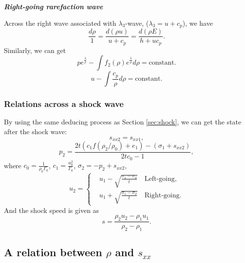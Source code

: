 \documentclass[review]{elsarticle}
\numberwithin{equation}{section}
\numberwithin{table}{section}
\begin{document}
\emph{\textbf{Right-going rarefaction wave} }

Across the right wave associated with $\lambda_3$-wave, ($\lambda_3=u+c_p$), we have
\begin{equation}
  \frac{d\rho}{1} = \frac{d(\rho u)}{u+c_p} = \frac{d(\rho E)}{h+uc_p}.
\end{equation}
Similarly, we can get %
\begin{equation}\label{eq:p_rhopR}
  p e^{\frac{\lambda}{\rho}} - \int f_2(\rho) e^{\frac{\lambda}{\rho}}d\rho = \text{constant}.
\end{equation}
\begin{equation}\label{eq:u_rhopR}
  u-\int\frac{c_p}{\rho} d\rho = \text{constant}.
\end{equation}

\subsubsection{Relations across  a shock wave}\label{sec:shockp}
By using the same deducing process as Section \ref{sec:shock}, we can get the state after the shock wave:
\begin{equation}
  s_{xx2} = s_{xx1},
\end{equation}
\begin{equation}\label{eq:shockp}
  p_2= \frac{2t(c_1f(\rho_2/\rho_0)+e_1)-(\sigma_1+s_{xx2})}{2tc_0-1},
\end{equation}
where $c_0 = \frac{1}{\rho_0\Gamma_0}$, $c_1 = \frac{a_0^2}{\Gamma_0}$, $\sigma_2 = -p_2 +s_{xx2}$,
\begin{equation}\label{eq:shockup}
  u_2 = \left\{ \begin{aligned}
	 & u_1 - \sqrt{\frac{\sigma_1- \sigma_2}{t}} \quad \text{Left-going}, \\
	 & u_1 + \sqrt{\frac{\sigma_1- \sigma_2}{t}} \quad \text{Right-going}.
	\end{aligned}
	\right.
  \end{equation}
And the shock speed is given as
\begin{equation}
  s = \frac{\rho_2u_2-\rho_1u_1}{\rho_2-\rho_1}.
\end{equation}



\subsection{A relation between $\rho$ and $s_{xx}$ }\label{sec:relation}
\end{document}
